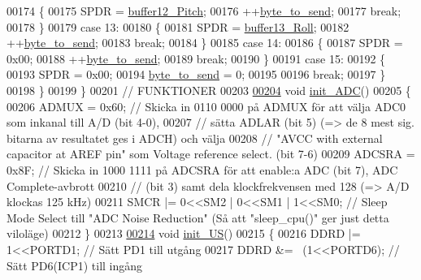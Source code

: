 \begin{DoxyCode}
00174         \{
00175             SPDR = \hyperlink{sensor_8h_a23007d6ec6eeeab1723fbd750b6ee8a3}{buffer12\_Pitch};
00176             ++\hyperlink{sensor_8h_addd1a9480a36b7d4c52a1237f5c17286}{byte\_to\_send};
00177             \textcolor{keywordflow}{break};
00178         \}
00179         \textcolor{keywordflow}{case} 13:
00180         \{
00181             SPDR = \hyperlink{sensor_8h_a95d464c150dfd1cc2c783dc00acd7533}{buffer13\_Roll};
00182             ++\hyperlink{sensor_8h_addd1a9480a36b7d4c52a1237f5c17286}{byte\_to\_send};
00183             \textcolor{keywordflow}{break};
00184         \}
00185         \textcolor{keywordflow}{case} 14:
00186         \{
00187             SPDR = 0x00;
00188             ++\hyperlink{sensor_8h_addd1a9480a36b7d4c52a1237f5c17286}{byte\_to\_send};
00189             \textcolor{keywordflow}{break};
00190         \}
00191         \textcolor{keywordflow}{case} 15:
00192         \{
00193             SPDR = 0x00;
00194             \hyperlink{sensor_8h_addd1a9480a36b7d4c52a1237f5c17286}{byte\_to\_send} = 0;
00195 
00196             \textcolor{keywordflow}{break};
00197         \}
00198     \}
00199 \}
00201 \textcolor{comment}{//                      FUNKTIONER}
00203 \textcolor{comment}{}
\hypertarget{sensor_8c_source.tex_l00204}{}\hyperlink{sensor_8h_a342ab07b607f3dc4efa0655ca1acd164}{00204} \textcolor{keywordtype}{void} \hyperlink{sensor_8c_a342ab07b607f3dc4efa0655ca1acd164}{init\_ADC}()
00205 \{
00206     ADMUX = 0x60;                       \textcolor{comment}{// Skicka in 0110 0000 på ADMUX för att välja ADC0 som inkanal till
       A/D (bit 4-0),}
00207     \textcolor{comment}{// sätta ADLAR (bit 5) (=> de 8 mest sig. bitarna av resultatet ges i ADCH) och välja}
00208     \textcolor{comment}{// "AVCC with external capacitor at AREF pin" som Voltage reference select. (bit 7-6)}
00209     ADCSRA = 0x8F;                      \textcolor{comment}{// Skicka in 1000 1111 på ADCSRA för att enable:a ADC (bit 7), ADC
       Complete-avbrott}
00210     \textcolor{comment}{// (bit 3) samt dela klockfrekvensen med 128 (=> A/D klockas 125 kHz)}
00211     SMCR |= 0<<SM2 | 0<<SM1 | 1<<SM0;   \textcolor{comment}{// Sleep Mode Select till "ADC Noise Reduction" (Så att
       "sleep\_cpu()" ger just detta viloläge)}
00212 \}
00213 
\hypertarget{sensor_8c_source.tex_l00214}{}\hyperlink{sensor_8h_a16afe9a4d2627f3f7f1bab054d4ad7ad}{00214} \textcolor{keywordtype}{void} \hyperlink{sensor_8c_a16afe9a4d2627f3f7f1bab054d4ad7ad}{init\_US}()
00215 \{
00216     DDRD |= 1<<PORTD1;                  \textcolor{comment}{// Sätt PD1 till utgång}
00217     DDRD &= ~(1<<PORTD6);               \textcolor{comment}{// Sätt PD6(ICP1) till ingång}

\end{DoxyCode}
